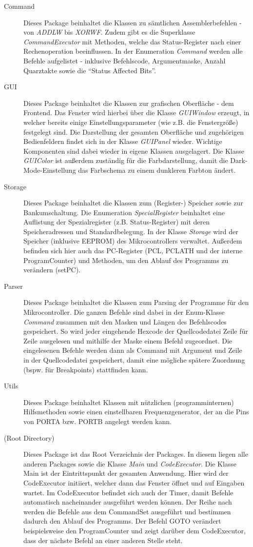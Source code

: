 \begin{description}
\item[Command]{Dieses Package beinhaltet die Klassen zu sämtlichen Assemblerbefehlen - von \textit{ADDLW} bis \textit{XORWF}. Zudem gibt es die Superklasse \textit{CommandExecutor} mit Methoden, welche das Status-Register nach einer Rechenoperation beeinflussen. In der Enumeration \textit{Command} werden alle Befehle aufgelistet - inklusive Befehlscode, Argumentmaske, Anzahl Quarztakte sowie die \enquote{Status Affected Bits}.}
\item[GUI]{Dieses Package beinhaltet die Klassen zur grafischen Oberfläche - dem Frontend. Das Fenster wird hierbei über die Klasse \textit{GUIWindow} erzeugt, in welcher bereits einige Einstellungsparameter (wie z.B. die Fenstergröße) festgelegt sind. Die Darstellung der gesamten Oberfläche und zugehörigen Bedienfeldern findet sich in der Klasse \textit{GUIPanel} wieder. Wichtige Komponenten sind dabei wieder in eigene Klassen ausgelagert. Die Klasse \textit{GUIColor} ist außerdem zuständig für die Farbdarstellung, damit die Dark-Mode-Einstellung das Farbschema zu einem dunkleren Farbton ändert. }
\item[Storage]{Dieses Package beinhaltet die Klassen zum (Register-) Speicher sowie zur Bankumschaltung. Die Enumeration \textit{SpecialRegister} beinhaltet eine Auflistung der Spezialregister (z.B. Status-Register) mit deren Speicheradressen und Standardbelegung. In der Klasse \textit{Storage} wird der Speicher (inklusive EEPROM) des Mikrocontrollers verwaltet.  Außerdem befinden sich hier auch das PC-Register (PCL, PCLATH und der interne ProgramCounter) und Methoden, um den Ablauf des Programms zu verändern (setPC). }
\item[Parser]{Dieses Package beinhaltet die Klassen zum Parsing der Programme für den Mikrocontroller. Die ganzen Befehle sind dabei in der Enum-Klasse \textit{Command} zusammen mit den Masken und Längen des Befehlscodes gespeichert. So wird jeder eingehende Hexcode der Quellcodedatei Zeile für Zeile ausgelesen und mithilfe der Maske einem Befehl zugeordnet. Die eingelesenen Befehle werden dann als Command mit Argument und Zeile in der Quellcodedatei gespeichert, damit eine mögliche spätere Zuordnung (bspw. für Breakpoints) stattfinden kann. }
\item[Utils]{Dieses Package beinhaltet Klassen mit nützlichen (programminternen) Hilfsmethoden sowie einen einstellbaren Frequenzgenerator, der an die Pins von PORTA bzw. PORTB angelegt werden kann.}
\item[(Root Directory)]{Dieses Package ist das Root Verzeichnis der Packages. In diesem liegen alle anderen Packages sowie die Klasse \textit{Main} und \textit{CodeExecutor}. Die Klasse Main ist der Eintrittspunkt der gesamten Anwendung. Hier wird der CodeExecutor initiiert, welcher dann das Fenster öffnet und auf Eingaben wartet. Im CodeExecutor befindet sich auch der Timer, damit Befehle automatisch nacheinander ausgeführt werden können. Der Reihe nach werden die Befehle aus dem CommandSet ausgeführt und bestimmen dadurch den Ablauf des Programms. Der Befehl GOTO verändert beispielsweise den ProgramCounter und zeigt darüber dem CodeExecutor, dass der nächste Befehl an einer anderen Stelle steht. }

\end{description}

